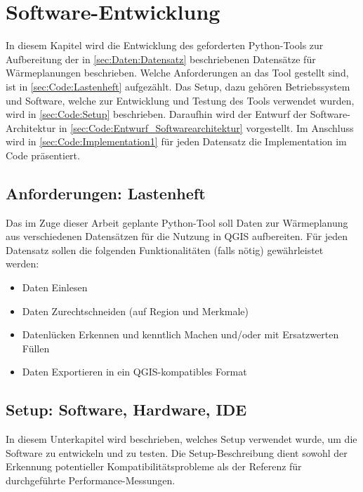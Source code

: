 
\chapter{Software-Entwicklung}
	In diesem Kapitel wird die Entwicklung des geforderten Python-Tools zur Aufbereitung der in \autoref{sec:Daten:Datensatz} beschriebenen Datensätze für Wärmeplanungen beschrieben. Welche Anforderungen an das Tool gestellt sind, ist in \autoref{sec:Code:Lastenheft} aufgezählt. Das Setup, dazu gehören Betriebssystem und Software, welche zur Entwicklung und Testung des Tools verwendet wurden, wird in \autoref{sec:Code:Setup} beschrieben. Daraufhin wird der Entwurf der Software-Architektur in \autoref{sec:Code:Entwurf_Softwarearchitektur} vorgestellt. Im Anschluss wird in \autoref{sec:Code:Implementation1} für jeden Datensatz die Implementation im Code präsentiert. 
	
	\section{Anforderungen: Lastenheft}
	\label{sec:Code:Lastenheft}
		
		Das im Zuge dieser Arbeit geplante Python-Tool soll Daten zur Wärmeplanung aus verschiedenen Datensätzen für die Nutzung in QGIS aufbereiten. Für jeden Datensatz sollen die folgenden Funktionalitäten (falls nötig) gewährleistet werden: 
		\begin{itemize}
			\item Daten Einlesen
			\item Daten Zurechtschneiden (auf Region und Merkmale)
			\item Datenlücken Erkennen und kenntlich Machen und/oder mit Ersatzwerten Füllen
			\item Daten Exportieren in ein QGIS-kompatibles Format
		\end{itemize}
	
	\section{Setup: Software, Hardware, IDE}
	\label{sec:Code:Setup}
		In diesem Unterkapitel wird beschrieben, welches Setup verwendet wurde, um die Software zu entwickeln und zu testen. Die Setup-Beschreibung dient sowohl der Erkennung potentieller Kompatibilitätsprobleme als der Referenz für durchgeführte Performance-Messungen.\\ 
		
